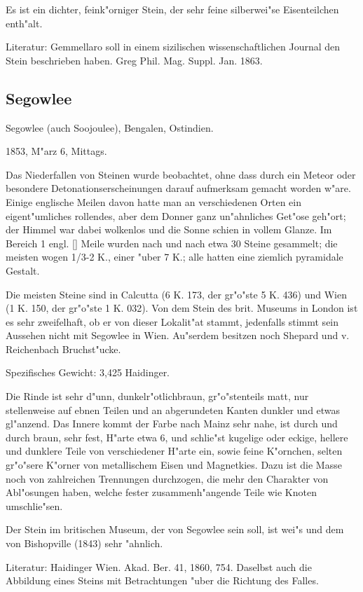 \documentclass[a4paper, 11pt, oneside]{article}
\begin{document}
Es ist ein dichter, feink"orniger Stein, der sehr feine silberwei"se Eisenteilchen enth"alt.

Literatur: Gemmellaro soll in einem sizilischen wissenschaftlichen Journal den Stein beschrieben haben. Greg Phil. Mag. Suppl. Jan. 1863.

\subsection{Segowlee}

Segowlee (auch Soojoulee), Bengalen, Ostindien.

1853, M"arz 6, Mittags.

Das Niederfallen von Steinen wurde beobachtet, ohne dass durch ein Meteor oder besondere Detonationserscheinungen darauf aufmerksam gemacht worden w"are. Einige englische Meilen davon hatte man an verschiedenen Orten ein eigent"umliches rollendes, aber dem Donner ganz un"ahnliches Get"ose geh"ort; der Himmel war dabei wolkenlos und die Sonne schien in vollem Glanze. Im Bereich 1 engl. [] Meile wurden nach und nach etwa 30 Steine gesammelt; die meisten wogen 1/3-2 K., einer "uber 7 K.; alle hatten eine ziemlich pyramidale Gestalt.

Die meisten Steine sind in Calcutta (6 K. 173, der gr"o"ste 5 K. 436) und Wien (1 K. 150, der gr"o"ste 1 K. 032). Von dem Stein des brit. Museums in London ist es sehr zweifelhaft, ob er von dieser Lokalit"at stammt, jedenfalls stimmt sein Aussehen nicht mit Segowlee in Wien. Au"serdem besitzen noch Shepard und v. Reichenbach Bruchst"ucke.

Spezifisches Gewicht: 3,425 Haidinger.

Die Rinde ist sehr d"unn, dunkelr"otlichbraun, gr"o"stenteils matt, nur stellenweise auf ebnen Teilen und an abgerundeten Kanten dunkler und etwas gl"anzend. Das Innere kommt der Farbe nach Mainz sehr nahe, ist durch und durch braun, sehr fest, H"arte etwa 6, und schlie"st kugelige oder eckige, hellere und dunklere Teile von verschiedener H"arte ein, sowie feine K"ornchen, selten gr"o"sere K"orner von metallischem Eisen und Magnetkies. Dazu ist die Masse noch von zahlreichen Trennungen durchzogen, die mehr den Charakter von Abl"osungen haben, welche fester zusammenh"angende Teile wie Knoten umschlie"sen.

Der Stein im britischen Museum, der von Segowlee sein soll, ist wei"s und dem von Bishopville (1843) sehr "ahnlich.

Literatur: Haidinger Wien. Akad. Ber. 41, 1860, 754. Daselbst auch die Abbildung eines Steins mit Betrachtungen "uber die Richtung des Falles.
\end{document}
